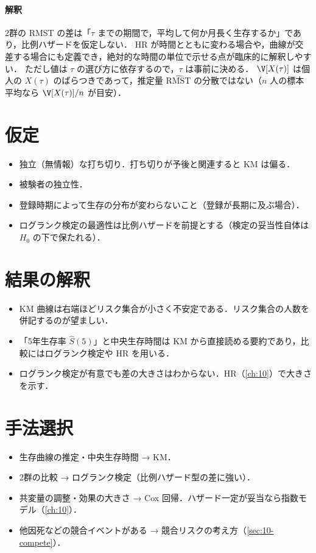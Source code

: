 \paragraph{解釈}
2群の RMST の差は「$\tau$ までの期間で，平均して何か月長く生存するか」であり，比例ハザードを仮定しない．
HR が時間とともに変わる場合や，曲線が交差する場合にも定義でき，絶対的な時間の単位で示せる点が臨床的に解釈しやすい．
ただし値は $\tau$ の選び方に依存するので，$\tau$ は事前に決める．
$\V[X(\tau)]$ は個人の $X(\tau)$ のばらつきであって，推定量 $\widehat{\mathrm{RMST}}$ の分散ではない（$n$ 人の標本平均なら $\V[X(\tau)]/n$ が目安）．

\section{仮定}\label{sec:09-assump}
\begin{itemize}
\item 独立（無情報）な打ち切り．打ち切りが予後と関連すると KM は偏る．
\item 被験者の独立性．
\item 登録時期によって生存の分布が変わらないこと（登録が長期に及ぶ場合）．
\item ログランク検定の最適性は比例ハザードを前提とする（検定の妥当性自体は $H_0$ の下で保たれる）．
\end{itemize}

\section{結果の解釈}\label{sec:09-interp}
\begin{itemize}
\item KM 曲線は右端ほどリスク集合が小さく不安定である．リスク集合の人数を併記するのが望ましい．
\item 「5年生存率 $\hat S(5)$」と中央生存時間は KM から直接読める要約であり，比較にはログランク検定や HR を用いる．
\item ログランク検定が有意でも差の大きさはわからない．HR（\cref{ch:10}）で大きさを示す．
\end{itemize}

\section{手法選択}\label{sec:09-choice}
\begin{itemize}
\item 生存曲線の推定・中央生存時間 → KM．
\item 2群の比較 → ログランク検定（比例ハザード型の差に強い）．
\item 共変量の調整・効果の大きさ → Cox 回帰．ハザード一定が妥当なら指数モデル（\cref{ch:10}）．
\item 他因死などの競合イベントがある → 競合リスクの考え方（\cref{sec:10-compete}）．
\end{itemize}

